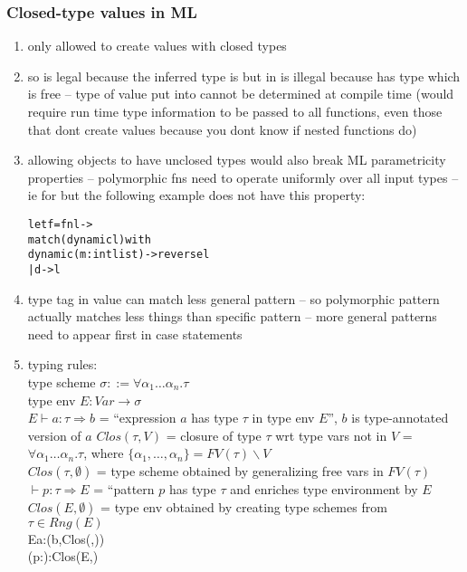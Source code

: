 \documentclass[12pt]{article}	%
\begin{document}
\subsubsection*{Closed-type \Dynamic values in ML}
\begin{enumerate}
	\item only allowed to create \Dynamic values with closed types
	\item so  is legal because the inferred type is  but \Dynamic in  is illegal because  has type \code{\alpha} which is free -- type of value put into \Dynamic cannot be determined at compile time (would require run time type information to be passed to all functions, even those that dont create \Dynamic values because you dont know if nested functions do)
	\item allowing \Dynamic objects to have unclosed types would also break ML parametricity properties -- polymorphic fns need to operate uniformly over all input types -- ie  for  but the following example does not have this property:
	\begin{alltt}
	let f = fn l ->
	  match (dynamic l) with
	    dynamic(m:int list) -> reverse l
	  | d -> l
	\end{alltt}
	\item type tag in \Dynamic value can match less general pattern -- so polymorphic pattern actually matches less things than specific pattern -- more general patterns need to appear first in case statements

	\item typing rules: \\
	type scheme $\sigma ::= \forall\alpha_1\ldots\alpha_n.\tau$\\
	type env $E : Var \rightarrow \sigma$\\
	$E\vdash a:\tau \Rightarrow b$ = ``expression $a$ has type $\tau$ in type env $E$'', $b$ is type-annotated version of $a$
	$Clos(\tau,V)$ = closure of type $\tau$ wrt type vars not in $V$ = $\forall\alpha_1\ldots\alpha_n.\tau$, where $\{\alpha_1,\ldots,\alpha_n\} = FV(\tau)\backslash V$\\
	$Clos(\tau,\emptyset)$ = type scheme obtained by generalizing free vars in $FV(\tau)$ \\
	$\vdash p:\tau\Rightarrow E$ = ``pattern $p$ has type $\tau$ and enriches type environment by $E$ \\
	$Clos(E,\emptyset)$ = type env obtained by creating type schemes from $\tau \in Rng(E)$\\
	          {E\vdash \dynamic\;a:\Dynamic\Rightarrow\dynamic(b,Clos(\tau,\emptyset))} \\
	          {\vdash\dynamic(p:\tau):\Dynamic\Rightarrow Clos(E,\emptyset)}
	

\end{enumerate}
\end{document}
